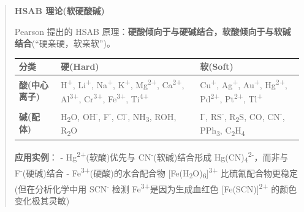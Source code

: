 \documentclass[a4paper,11pt]{ctexart}
\newcounter{none}
\newcommand{\箭}{\ensuremath{\rightarrow}}
\newcommand{\左箭}{\ensuremath{\leftarrow}}
\newcommand{\上箭}{\ensuremath{\uparrow}}
\newcommand{\下箭}{\ensuremath{\downarrow}}
\newcommand{\衡}{\ensuremath{\rightleftharpoons}}
\newcommand{\双箭}{\ensuremath{\leftrightarrow}}
\newcommand{\约等于}{\ensuremath{\approx}}
\newcommand{\小于等于}{\ensuremath{\leq}}
\newcommand{\大于等于}{\ensuremath{\geq}}
\newcommand{\不等于}{\ensuremath{\neq}}
\newcommand{\西格马}{\ensuremath{\sigma}}
\newcommand{\派}{\ensuremath{\pi}}
\begin{document}
\begin{quote}
\textbf{HSAB 理论(软硬酸碱)}

Pearson 提出的 HSAB 原理：\textbf{硬酸倾向于与硬碱结合，软酸倾向于与软碱结合}(``硬亲硬，软亲软'')。

{\def\LTcaptype{none} %
\begin{longtable}[]{@{}
  >{\raggedright\arraybackslash}p{}
  >{\raggedright\arraybackslash}p{}
  >{\raggedright\arraybackslash}p{}@{}}
\toprule\noalign{}
\begin{minipage}[b]{\linewidth}\raggedright
分类
\end{minipage} & \begin{minipage}[b]{\linewidth}\raggedright
硬(Hard)
\end{minipage} & \begin{minipage}[b]{\linewidth}\raggedright
软(Soft)
\end{minipage} \\
\midrule\noalign{}
\endhead
\bottomrule\noalign{}
\endlastfoot
\textbf{酸(中心离子)} & H\textsuperscript{+}, Li\textsuperscript{+}, Na\textsuperscript{+}, K\textsuperscript{+}, Mg\textsuperscript{2+}, Ca\textsuperscript{2+}, Al\textsuperscript{3+}, Cr\textsuperscript{3+}, Fe\textsuperscript{3+}, Ti\textsuperscript{4+} & Cu\textsuperscript{+}, Ag\textsuperscript{+}, Au\textsuperscript{+}, Hg\textsuperscript{2+}, Pd\textsuperscript{2+}, Pt\textsuperscript{2+}, Tl\textsuperscript{+} \\
\textbf{碱(配体)} & H\textsubscript{2}O, OH\textsuperscript{-}, F\textsuperscript{-}, Cl\textsuperscript{-}, NH\textsubscript{3}, ROH, R\textsubscript{2}O & I\textsuperscript{-}, RS\textsuperscript{-}, R\textsubscript{2}S, CO, CN\textsuperscript{-}, PPh\textsubscript{3}, C\textsubscript{2}H\textsubscript{4} \\
\end{longtable}
}

\textbf{应用实例}：
- Hg\textsuperscript{2+}(软酸)优先与 CN\textsuperscript{-}(软碱)结合形成 Hg(CN)\textsubscript{4}\textsuperscript{2-}，而非与 F\textsuperscript{-}(硬碱)结合
- Fe\textsuperscript{3+}(硬酸)的水合配合物 {[}Fe(H\textsubscript{2}O)\textsubscript{6}{]}\textsuperscript{3+} 比硫氰配合物更稳定(但在分析化学中用 SCN\textsuperscript{-} 检测 Fe\textsuperscript{3+}是因为生成血红色 {[}Fe(SCN){]}\textsuperscript{2+} 的颜色变化极其灵敏)
\end{quote}
\end{document}
